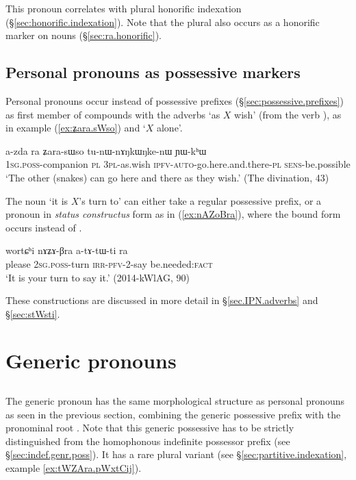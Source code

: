 This pronoun correlates with plural honorific indexation  (§\ref{sec:honorific.indexation}). Note that the plural  also occurs as a honorific marker on nouns (§\ref{sec:ra.honorific}).

\subsection{Personal pronouns as possessive markers} \label{sec:pronouns.possessive.markers}
Personal pronouns occur instead of possessive prefixes (§\ref{sec:possessive.prefixes}) as first member of compounds  with the adverbs  `as $X$ wish' (from the verb ), as in example (\ref{ex:ʑara.sWso}) and  `$X$ alone'.  

\begin{exe}
\ex \label{ex:ʑara.sWso}
\gll a-zda ra ʑara-sɯso tu-nɯ-nɤŋkɯŋke-nɯ ɲɯ-kʰɯ \\
\textsc{1sg}.\textsc{poss}-companion \textsc{pl} \textsc{3pl}-as.wish \textsc{ipfv}-\textsc{auto}-go.here.and.there-\textsc{pl} \textsc{sens}-be.possible \\
\glt `The other (snakes) can go here and there as they wish.' (The divination, 43)
\end{exe}

The noun  `it is $X$'s turn to' can either take a regular possessive prefix, or a pronoun in \textit{status constructus} form as in (\ref{ex:nAZoBra}), where the bound form  occurs instead of .
\begin{exe}
\ex \label{ex:nAZoBra}
\gll  wortɕʰi nɤʑɤ-βra a-tɤ-tɯ-ti ra \\
please \textsc{2sg}.\textsc{poss}-turn \textsc{irr}-\textsc{pfv}-2-say be.needed:\textsc{fact} \\
\glt `It is your turn to say it.' (2014-kWlAG, 90)
\end{exe}


These constructions are discussed in more detail in §\ref{sec.IPN.adverbs} and §\ref{sec:stWsti}.

\section{Generic pronouns}  

\subsection{}  \label{sec:genr.pro}
The generic pronoun  has the same morphological structure as personal pronouns as seen in the previous section, combining the generic possessive prefix  with the pronominal root . Note that this generic possessive has to be strictly distinguished from the homophonous indefinite possessor prefix  (see §\ref{sec:indef.genr.poss}). It has a rare plural variant  (see  §\ref{sec:partitive.indexation}, example \ref{ex:tWZAra.pWxtCij}).

